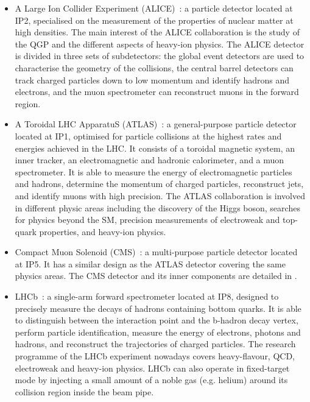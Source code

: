 \begin{itemize}

\item A Large Ion Collider Experiment (ALICE)~\cite{ALICE}: a particle detector located at IP2, specialised on the measurement of the properties of nuclear matter at high densities. The main interest of the ALICE collaboration is the study of the QGP and the different aspects of heavy-ion physics. The ALICE detector is divided in three sets of subdetectors: the global event detectors are used to characterise the geometry of the collisions, the central barrel detectors can track charged particles down to low momentum and identify hadrons and electrons, and the muon spectrometer can reconstruct muons in the forward region.

\item A Toroidal LHC ApparatuS (ATLAS)~\cite{ATLAS}: a general-purpose particle detector located at IP1, optimised for particle collisions at the highest rates and energies achieved in the LHC. It consists of a toroidal magnetic system, an inner tracker, an electromagnetic and hadronic calorimeter, and a muon spectrometer. It is able to measure the energy of electromagnetic particles and hadrons, determine the momentum of charged particles, reconstruct jets, and identify muons with high precision. The ATLAS collaboration is involved in different physic areas including the discovery of the Higgs boson, searches for physics beyond the SM, precision measurements of electroweak and top-quark properties, and heavy-ion physics.%

\item Compact Muon Solenoid (CMS)~\cite{CMS}: a multi-purpose particle detector located at IP5. It has a similar design as the ATLAS detector covering the same physics areas. The CMS detector and its inner components are detailed in .

\item LHCb~\cite{LHCb}: a single-arm forward spectrometer located at IP8, designed to precisely measure the decays of hadrons containing bottom quarks. It is able to distinguish between the interaction point and the b-hadron decay vertex, perform particle identification, measure the energy of electrons, photons and hadrons, and reconstruct the trajectories of charged particles. The research programme of the LHCb experiment nowadays covers heavy-flavour, QCD, electroweak and heavy-ion physics. LHCb can also operate in fixed-target mode by injecting a small amount of a noble gas (e.g. helium) around its collision region inside the beam pipe.

\end{itemize}

